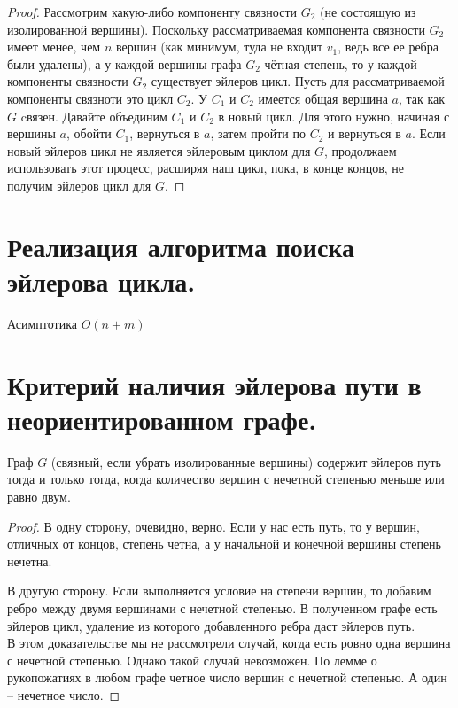 \begin{proof}
    Рассмотрим какую-либо компоненту связности $G_2$ (не состоящую из изолированной вершины). Поскольку рассматриваемая компонента связности $G_2$ имеет менее, чем $n$ вершин (как минимум, туда не входит $v_1$, ведь все ее ребра были удалены), а у каждой вершины графа $G_2$ чётная степень, то у каждой компоненты связности $G_2$ существует эйлеров цикл. Пусть для рассматриваемой компоненты связноти это цикл $C_2$. У $C_1$ и $C_2$ имеется общая вершина $a$, так как $G$ cвязен. Давайте объединим $C_1$ и $C_2$ в новый цикл. Для этого нужно, начиная с вершины $a$, обойти $C_1$, вернуться в $a$, затем пройти по $C_2$ и вернуться в $a$. Если новый эйлеров цикл не является эйлеровым циклом для $G$, продолжаем использовать этот процесс, расширяя наш цикл, пока, в конце концов, не получим эйлеров цикл для $G$.
    
\end{proof}

\setcounter{section}{40}
\section{Реализация алгоритма поиска эйлерова цикла.}



Асимптотика $O(n + m)$

\setcounter{section}{41}
\section{Критерий наличия эйлерова пути в неориентированном графе.}

\begin{theorem}
Граф $G$ (связный, если убрать изолированные вершины) содержит эйлеров путь тогда и только тогда, когда количество вершин с нечетной степенью меньше или равно двум.
\end{theorem}

\begin{proof}
В одну сторону, очевидно, верно. Если у нас есть путь, то у вершин, отличных от концов, степень четна, а у начальной и конечной вершины степень нечетна.

В другую сторону. Если выполняется условие на степени вершин, то добавим ребро между двумя вершинами с нечетной степенью. В полученном графе есть эйлеров цикл, удаление из которого добавленного ребра даст эйлеров путь.\\

В этом доказательстве мы не рассмотрели случай, когда есть ровно одна вершина с нечетной степенью. Однако такой случай невозможен. По лемме о рукопожатиях в любом графе четное число вершин с нечетной степенью. А один -- нечетное число.
\end{proof}


